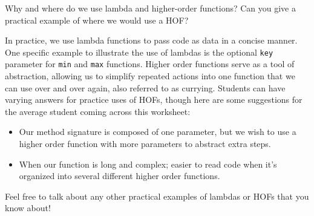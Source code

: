 \begin{blocksection}
\question Why and where do we use lambda and higher-order functions? Can you give a practical example of where we would use a HOF?

\begin{solution}[0.5in]
In practice, we use lambda functions to pass code as data in a concise manner. One specific example to illustrate the use of lambdas is the optional \lstinline{key} parameter for \lstinline{min} and \lstinline{max} functions.
Higher order functions serve as a tool of abstraction, allowing us to simplify repeated actions into one function that we can use over and over again, also referred to as currying.
Students can have varying answers for practice uses of HOFs, though here are some suggestions for the average student coming across this worksheet:
\begin{itemize}
    \item Our method signature is composed of one parameter, but we wish to use a higher order function with more parameters to abstract extra steps.
    \item When our function is long and complex; easier to read code when it's organized into several different higher order functions.
\end{itemize}

\end{solution}
\end{blocksection}

\begin{questionmeta}
    Feel free to talk about any other practical examples of lambdas or HOFs that you know about!
\end{questionmeta}
